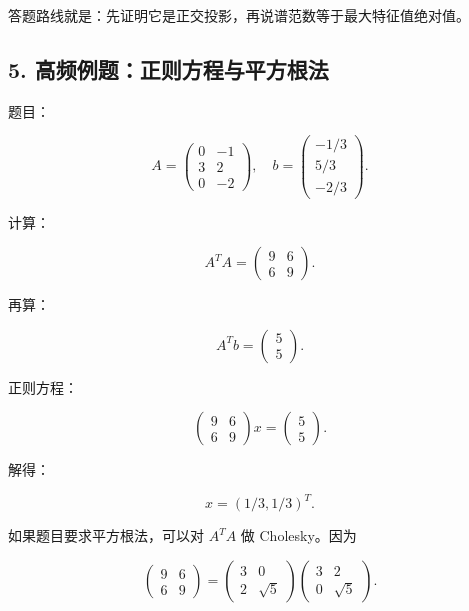 \documentclass[11pt,a4paper]{ctexart}
\begin{document}
答题路线就是：先证明它是正交投影，再说谱范数等于最大特征值绝对值。


\subsection*{5. 高频例题：正则方程与平方根法}


题目：

\[
A=\begin{pmatrix}0&-1\\3&2\\0&-2\end{pmatrix},\quad
b=\begin{pmatrix}-1/3\\5/3\\-2/3\end{pmatrix}.
\]

计算：

\[
A^TA=
\begin{pmatrix}
9&6\\
6&9
\end{pmatrix}.
\]

再算：

\[
A^Tb=
\begin{pmatrix}5\\5\end{pmatrix}.
\]

正则方程：

\[
\begin{pmatrix}9&6\\6&9\end{pmatrix}x=
\begin{pmatrix}5\\5\end{pmatrix}.
\]

解得：

\[
x=(1/3,1/3)^T.
\]

如果题目要求平方根法，可以对 $A^TA$ 做 Cholesky。因为

\[
\begin{pmatrix}9&6\\6&9\end{pmatrix}
=
\begin{pmatrix}3&0\\2&\sqrt5\end{pmatrix}
\begin{pmatrix}3&2\\0&\sqrt5\end{pmatrix}.
\]
\end{document}
